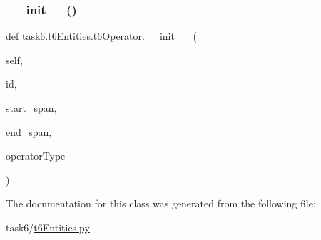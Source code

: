 \subsubsection{\texorpdfstring{\+\_\+\+\_\+init\+\_\+\+\_\+()}{\_\_init\_\_()}}
{\footnotesize\ttfamily def task6.\+t6\+Entities.\+t6\+Operator.\+\_\+\+\_\+init\+\_\+\+\_\+ (\begin{DoxyParamCaption}\item[{}]{self,  }\item[{}]{id,  }\item[{}]{start\+\_\+span,  }\item[{}]{end\+\_\+span,  }\item[{}]{operator\+Type }\end{DoxyParamCaption})}



The documentation for this class was generated from the following file\+:\begin{DoxyCompactItemize}
\item 
task6/\hyperlink{t6Entities_8py}{t6\+Entities.\+py}\end{DoxyCompactItemize}
